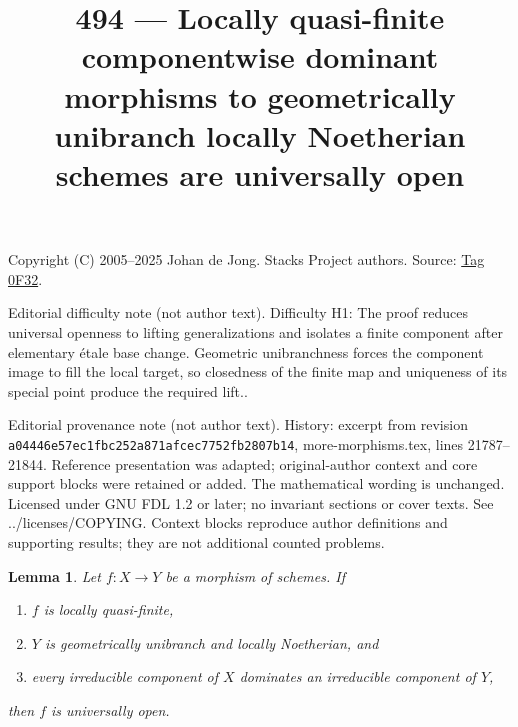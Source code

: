 \documentclass{amsart}
\theoremstyle{plain}
\newtheorem{lemma}[subsection]{Lemma}
\theoremstyle{definition}
\theoremstyle{remark}
\numberwithin{equation}{subsection}
\begin{document}
\title[Stacks Project, Tag 0F32]{494 --- Locally quasi-finite componentwise dominant morphisms to geometrically unibranch locally Noetherian schemes are universally open}
\maketitle
\noindent Copyright (C) 2005--2025 Johan de Jong. Stacks Project authors. Source: \href{https://stacks.math.columbia.edu/tag/0F32}{Tag 0F32}.

\noindent Editorial difficulty note (not author text). Difficulty H1: The proof reduces universal openness to lifting generalizations and isolates a finite component after elementary étale base change. Geometric unibranchness forces the component image to fill the local target, so closedness of the finite map and uniqueness of its special point produce the required lift..

\noindent Editorial provenance note (not author text). History: excerpt from revision \texttt{a0444\allowbreak 6e57e\allowbreak c1fbc\allowbreak 252a8\allowbreak 71afc\allowbreak ec775\allowbreak 2fb28\allowbreak 07b14}, more-morphisms.tex, lines 21787--21844. Reference presentation was adapted; original-author context and core support blocks were retained or added. The mathematical wording is unchanged. Licensed under GNU FDL 1.2 or later; no invariant sections or cover texts. See ../licenses/COPYING. Context blocks reproduce author definitions and supporting results; they are not additional counted problems.

\begin{lemma}
\label{lemma-quasi-finite-Noetherian-universally-open}
Let $f : X \to Y$ be a morphism of schemes. If
\begin{enumerate}
\item $f$ is locally quasi-finite,
\item $Y$ is geometrically unibranch and locally Noetherian, and
\item every irreducible component of $X$ dominates
an irreducible component of $Y$,
\end{enumerate}
then $f$ is universally open.
\end{lemma}
\end{document}
